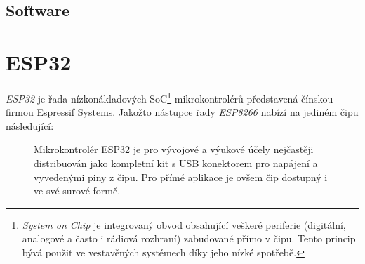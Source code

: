 \subsection{Software}

\section{ESP32}\label{sec:esp32}
\textit{ESP32} je řada nízkonákladových SoC\footnote{\textit{System on Chip} je integrovaný obvod obsahující veškeré
periferie (digitální, analogové a často i rádiová rozhraní) zabudované přímo v čipu.
Tento princip bývá použit ve vestavěných systémech díky jeho nízké spotřebě.} mikrokontrolérů představená čínskou
firmou Espressif Systems.
Jakožto nástupce řady \textit{ESP8266} nabízí na jediném čipu následující:

\begin{figure}
    \centering


    \caption{Mikrokontrolér ESP32 je pro vývojové a výukové účely nejčastěji distribuován jako kompletní kit s USB
    konektorem pro napájení a vyvedenými piny z čipu. %
    Pro přímé aplikace je ovšem čip dostupný i ve své surové formě.}

\end{figure}

